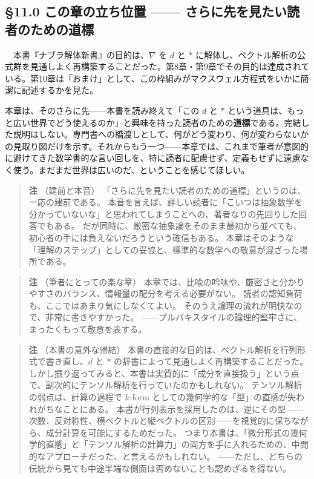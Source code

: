 \documentclass[a4paper,12pt,openany]{book}
\begin{document}
\hypertarget{ux3053ux306eux7ae0ux306eux7acbux3061ux4f4dux7f6e-ux3055ux3089ux306bux5148ux3092ux898bux305fux3044ux8aadux8005ux306eux305fux3081ux306eux9053ux6a19}{%
\subsection{§11.0 この章の立ち位置 ——
さらに先を見たい読者のための道標}\label{ux3053ux306eux7ae0ux306eux7acbux3061ux4f4dux7f6e-ux3055ux3089ux306bux5148ux3092ux898bux305fux3044ux8aadux8005ux306eux305fux3081ux306eux9053ux6a19}}

　本書『ナブラ解体新書』の目的は、\(\nabla\) を \(d\) と \(\ast\)
に解体し、ベクトル解析の公式群を見通しよく再構築することだった。第8章・第9章でその目的は達成されている。第10章は「おまけ」として、この枠組みがマクスウェル方程式をいかに簡潔に記述するかを見た。

本章は、そのさらに先——本書を読み終えて「この \(d\) と \(\ast\)
という道具は、もっと広い世界でどう使えるのか」と興味を持った読者のための\textbf{道標}である。完結した説明はしない。専門書への橋渡しとして、何がどう変わり、何が変わらないかの見取り図だけを示す。それからもう一つ——本章では、これまで筆者が意図的に避けてきた数学書的な言い回しを、特に読者に配慮せず、定義もせずに遠慮なく使う。まだまだ世界は広いのだ、ということを感じてほしい。

\begin{quote}
\textbf{注} （建前と本音）
「さらに先を見たい読者のための道標」というのは、一応の建前である。
本音を言えば、詳しい読者に「こいつは抽象数学を分かっていないな」と思われてしまうことへの、著者なりの先回りした回答でもある。
だが同時に、厳密な抽象論をそのまま最初から並べても、初心者の手には負えないだろうという確信もある。
本章はそのような「理解のステップ」としての妥協と、標準的な数学への敬意が混ざった場所である。
\end{quote}

\begin{quote}
\textbf{注} （筆者にとっての楽な章）
本章では、比喩の吟味や、厳密さと分かりやすさのバランス、情報量の配分を考える必要がない。
読者の認知負荷も、ここではあまり気にしなくてよい。
そのうえ論理の流れが明快なので、非常に書きやすかった。
——ブルバキスタイルの論理的堅牢さに、まったくもって敬意を表する。
\end{quote}

\begin{quote}
\textbf{注} （本書の意外な帰結）
本書の直接的な目的は、ベクトル解析を行列形式で書き直し、\(d\) と
\(\ast\) の辞書によって見通しよく再構築することだった。
しかし振り返ってみると、本書は実質的に「成分を直接扱う」という点で、副次的にテンソル解析を行っていたのかもしれない。
テンソル解析の弱点は、計算の過程で \(k\)-form
としての幾何学的な「型」の直感が失われがちなことにある。
本書が行列表示を採用したのは、逆にその型——次数、反対称性、横ベクトルと縦ベクトルの区別——を視覚的に保ちながら、成分計算を可能にするためだった。
つまり本書は、「微分形式の幾何学的直感」と「テンソル解析の計算力」の両方を手に入れるための、中間的なアプローチだった、と言えるかもしれない。
——ただし、どちらの伝統から見ても中途半端な側面は否めないことも認めざるを得ない。
\end{quote}
\end{document}
